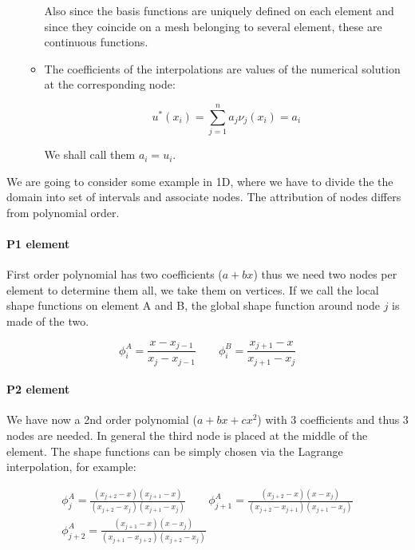 \begin{itemize}
\begin{itemize}
Also since the basis functions are uniquely defined on each element and since they coincide on a mesh belonging to several element, these are continuous functions. \\

\item The coefficients of the interpolations are values of the numerical solution at the corresponding node: 

\begin{equation}
u^* (x_i) = \sum _{j = 1}^n a_j \nu_j(x_i) = a_i
\end{equation}

We shall call them $a_i = u_i$. \\
\end{itemize}
\end{itemize}


We are going to consider some example in 1D, where we have to divide the the domain into set of intervals and associate nodes. The attribution of nodes differs from polynomial order. 

\paragraph{P1 element}
First order polynomial has two coefficients ($a + bx$) thus we need two nodes per element to determine them all, we take them on vertices. If we call the local shape functions on element A and B, the global shape function around node $j$ is made of the two.

\begin{equation}
\phi _i^A = \frac{x-x_{j-1}}{x_j-x_{j-1}}\qquad\phi _i^B = \frac{x_{j+1}-x}{x_{j+1}-x_j}
\end{equation}

\paragraph{P2 element}
We have now a 2nd order polynomial ($a + bx + cx^2$) with 3 coefficients and thus 3 nodes are needed. In general the third node is placed at the middle of the element. The shape functions can be simply chosen via the Lagrange interpolation, for example: 

\begin{equation}
\begin{array}{c}
\phi _j ^A = \frac{(x_{j+2} - x)(x_{j+1} - x)}{(x_{j+2} - x_j)(x_{j+1} - x_j)} \qquad \phi _{j+1} ^A = \frac{(x_{j+2} - x)(x - x_j)}{(x_{j+2} - x_{j+1})(x_{j+1}- x_{j})} \\
\phi _{j+2} ^A = \frac{(x_{j+1} - x)(x - x_j)}{(x_{j+1} - x_{j+2})(x_{j+2}- x_{j})}
\end{array}
\end{equation}

